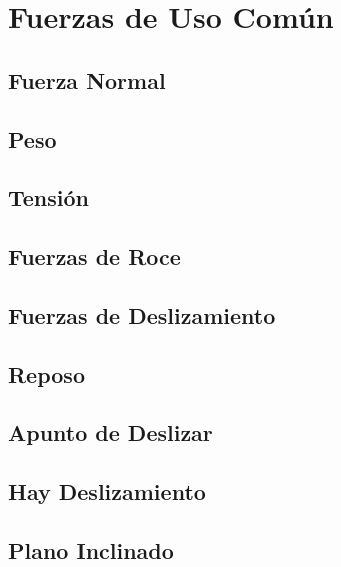 \chapter{Fuerzas de Uso Común}

\section{Fuerza Normal}

\newpage
\section{Peso}

\newpage
\section{Tensión}

\newpage
\section{Fuerzas de Roce}

\newpage
\section{Fuerzas de Deslizamiento}

\newpage
\section{Reposo}

\newpage
\section{Apunto de Deslizar}

\newpage
\section{Hay Deslizamiento}

\newpage
\section{Plano Inclinado}